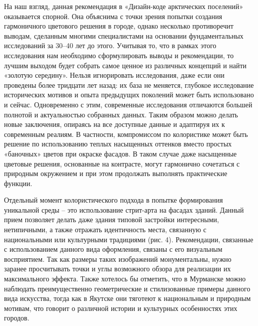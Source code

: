 На наш взгляд, данная рекомендация в «Дизайн-коде арктических поселений» оказывается спорной.
Она объяснима с точки зрения попытки создания гармоничного цветового решения в городе, однако несколько противоречит выводам,
сделанным многими специалистами на основании фундаментальных исследований за 30–40 лет до этого.
Учитывая то, что в рамках этого исследования нам необходимо сформулировать выводы и рекомендации,
то лучшим выходом будет собрать самое ценное из различных концепций и найти «золотую середину».
Нельзя игнорировать исследования, даже если они проведены более тридцати лет назад: их база не меняется,
глубокое исследование исторических мотивов и опыта предыдущих поколений может быть использовано и сейчас.
Одновременно с этим, современные исследования отличаются большей полнотой и актуальностью собранных данных.
Таким образом можно делать новые заключения, опираясь на все доступные данные и адаптируя их к современным реалиям.
В частности, компромиссом по колористике может быть решение по использованию теплых насыщенных оттенков вместо простых «баночных» цветов при окраске фасадов.
В таком случае даже насыщенные цветовые решения, основанные на контрасте, могут гармонично сочетаться с природным окружением и при этом продолжать выполнять практические функции.

Отдельный момент колористического подхода в попытке формирования уникальной среды – это использование стрит-арта на фасадах зданий.
Данный прием позволяет делать даже здания типовой застройки интересными, нетипичными, а также отражать идентичность места, связанную с национальными или культурными традициями (рис. 4).
Рекомендации, связанные с использованием данного вида оформления, связаны с его визуальным восприятием. Так как размеры таких изображений монументальны,
нужно заранее просчитывать точки и углы возможного обзора для реализации их максимального эффекта.
Также хотелось бы отметить, что в Мурманске можно наблюдать преимущественно геометрические и стилизованные примеры данного вида искусства,
тогда как в Якутске они тяготеют к национальным и природным мотивам, что говорит о различной истории и культурных особенностях этих городов.

